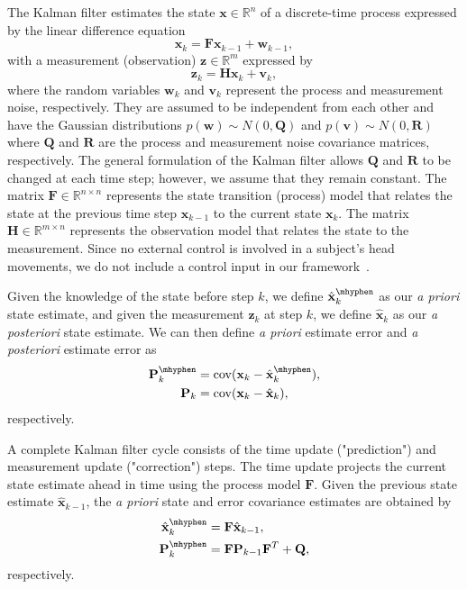 \documentclass[sigconf]{acmart}			%
\newcommand{\matr}[1]{\mathrm{\mathbf{#1}}}
\begin{document}
The Kalman filter estimates the state $\mathbf{x}\in\mathbb{R}^n$ of a
discrete-time process expressed by the linear difference equation
\begin{equation}
	\label{eq:discrete_model}
	\mathbf{x}_k = \matr{F}\mathbf{x}_{k-1} + \mathbf{w}_{k-1},
\end{equation}
with a measurement (observation) $\mathbf{z}\in\mathbb{R}^m$ expressed by
\begin{equation}
	\mathbf{z}_k = \matr{H}\mathbf{x}_k + \mathbf{v}_{k},
\end{equation}
where the random variables $\mathbf{w}_{k}$ and $\mathbf{v}_{k}$ represent the process and measurement noise, respectively. 
They are assumed to be independent from each other and have the Gaussian distributions $\mathit{p}(\mathbf{w})\sim \mathit{N}(0,\matr{Q})$ and $\mathit{p}(\mathbf{v})\sim \mathit{N}(0,\matr{R})$ where $\matr{Q}$ and $\matr{R}$ are the process and measurement noise covariance matrices, respectively.
The general formulation of the Kalman filter allows $\matr{Q}$ and $\matr{R}$ to be changed at each time step; however, we assume that they remain constant.
The matrix $\matr{F}\in\mathbb{R}^{n\times n}$ represents the state transition (process) model that relates the state at the previous time step $\mathbf{x}_{k-1}$ to the current state $\mathbf{x}_{k}$. 
The matrix $\matr{H}\in\mathbb{R}^{m\times n}$ represents the observation model that relates the state to the measurement.
Since no external control is involved in a subject's head movements, we do not include a control input in our framework~\cite{welch1995}.

Given the knowledge of the state before step $k$, we define $\hat{\mathbf{x}}_{k}^\mhyphen$ as our \textit{a priori} state estimate, and given the measurement $\mathbf{z}_k$ at step $k$, we define $\hat{\mathbf{x}}_{k}$ as our \textit{a posteriori} state estimate. 
We can then define \textit{ a priori} estimate error and \textit{a posteriori} estimate error as
\begin{align} 
	\matr{P}_k^\mhyphen &= \mathrm{cov}(\mathbf{x}_k-\hat{\mathbf{x}}_{k}^\mhyphen), \\ 
	\matr{P}_k &= \mathrm{cov}(\mathbf{x}_k-\hat{\mathbf{x}}_{k}), 
\end{align}
respectively. 

A complete Kalman filter cycle consists of the time update ("prediction") and measurement update ("correction") steps. 
The time update projects the current state estimate ahead in time using the process model $\matr{F}$. 
Given the previous state estimate $\hat{\mathbf{x}}_{k-1}$, the \emph{a priori} state and error covariance estimates are obtained by
\begin{align}
	\hat{\mathbf{x}}_{k}^\mhyphen &= \matr{F}\hat{\mathbf{x}}_{k-1}, \label{eq:process}  \\
	\matr{P}_{k}^\mhyphen &= \matr{F}\matr{P}_{k-1}\matr{F}^T + \matr{Q},
\end{align}
respectively.
\end{document}
